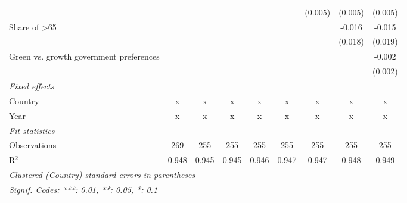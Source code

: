 \begin{table}[htbp]
\begin{tabular}{lcccccccc}
                                                  &              &             &         &         &         & (0.005) & (0.005) & (0.005)\\   
      Share of >65                                &              &             &         &         &         &         & -0.016  & -0.015\\   
                                                  &              &             &         &         &         &         & (0.018) & (0.019)\\   
      Green vs. growth government preferences     &              &             &         &         &         &         &         & -0.002\\   
                                                  &              &             &         &         &         &         &         & (0.002)\\   
      \emph{Fixed effects}\\
      Country                                     & x            & x           & x       & x       & x       & x       & x       & x\\  
      Year                                        & x            & x           & x       & x       & x       & x       & x       & x\\  
      \midrule \emph{Fit statistics}\\
      Observations                                & 269          & 255         & 255     & 255     & 255     & 255     & 255     & 255\\  
      R$^2$                                       & 0.948        & 0.945       & 0.945   & 0.946   & 0.947   & 0.947   & 0.948   & 0.949\\  
      \midrule
      \multicolumn{9}{l}{\emph{Clustered (Country) standard-errors in parentheses}}\\
      \multicolumn{9}{l}{\emph{Signif. Codes: ***: 0.01, **: 0.05, *: 0.1}}\\
   \end{tabular}
\end{table}


